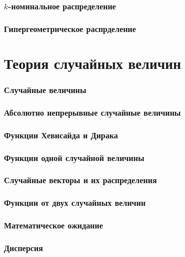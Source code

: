\section{$k$-номинальное распределение}

\section{Гипергеометрическое распрделение}



\part{Теория случайных величин}

\section{Случайные величины}

\section{Абсолютно непрерывные случайные величины}

\section{Функции Хевисайда и Дирака}

\section{Функции одной случайной величины}

\section{Случайные векторы и их распределения}

\section{Функции от двух случайных величин}

\section{Математическое ожидание}

\section{Дисперсия}

